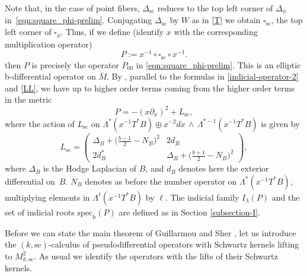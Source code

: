 \documentclass[JEP,XML,SOM,Unicode,NoFloatCountersInSection,published]{cedram}
\theoremstyle{plain}
\theoremstyle{definition}
\newcommand{\bb}{{\mathrm{b}}}
\newcommand{\ssc}{{\mathrm{sc}}}
\newcommand{\specb}{\mathrm{spec}_\bb}
\newcommand{\Mbar}{{\overline{M}}}\let\M\Mbar
\begin{document}
Note that, in the case of point fibers, $\Delta_{\ssc}$ reduces to the top left corner of $\Delta_{\phi}$ in~\eqref{eqn:square_phi-prelim}. Conjugating $\Delta_{\ssc}$ by $W$ as in \eqref{T} we obtain $\square_{\ssc}$, the top left corner of $\square_\phi$.
Thus, if we define (identify $x$ with the corresponding multiplication operator)
\begin{equation}\label{P-square-relation}
P:= x^{-1} \circ \square_{\ssc} \circ x^{-1}.
\end{equation}
then $P$ is precisely the operator $P_{00}$ in \eqref{eqn:square_phi-prelim}.
This is an elliptic b-differential operator on $\Mbar$. By \cite[(15)]{guillarmou2014low}, parallel to the formulas in
\eqref{indicial-operator-2} and \eqref{LL}, we have up to higher order terms coming from the
higher order terms in the metric
\begin{equation}\label{P00-sc}
P = -(x\partial_x)^{2} + L_{\ssc},
\end{equation}
where the action of $L_{\ssc}$ on $\Lambda^* (x^{-1} T^*B)
\oplus x^{-2} dx \,\wedge \,\Lambda^{*-1} (x^{-1} T^*B)$ is given by
\begin{equation}\label{P00-tangential-sc}
L_{\ssc} = \left(\begin{array}{cc}
\Delta_B + \bigl(\frac{b-1}2-N_B\bigr)^{2} &2d_B \\
2d_B^* & \Delta_B + \bigl(\frac{b+1}2-N_B\bigr)^{2}
\end{array} \right),
\end{equation}
where $\Delta_B$ is the Hodge Laplacian of $B$, and $d_B$ denotes here the exterior
differential on~$B$. $N_B$ denotes as before the number operator on $\Lambda^*(x^{-1} T^*B)$,
multiplying elements in $\Lambda^\ell(x^{-1} T^*B)$ by $\ell$. The indicial family $I_\lambda(P)$
and the set of indicial roots $\specb(P)$ are defined as in Section \ref{subsection-I}.

Before we can state the main theorem of Guillarmou and Sher \cite{guillarmou2014low},
let us introduce the $(k,\ssc)$-calculus of pseudodifferential operators with Schwartz kernels
lifting to $M^{2}_{k, \ssc}$. As usual we identify the operators with the lifts of their Schwartz kernels.
\end{document}
